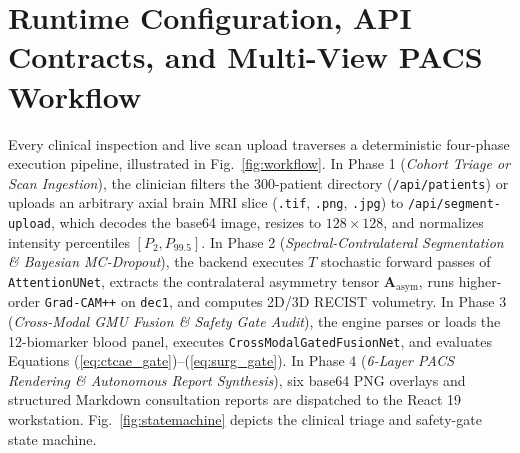 \documentclass[conference]{IEEEtran}
\begin{document}
\section{Runtime Configuration, API Contracts, and Multi-View PACS Workflow}
Every clinical inspection and live scan upload traverses a deterministic four-phase execution pipeline, illustrated in Fig.~\ref{fig:workflow}. In Phase 1 (\textit{Cohort Triage or Scan Ingestion}), the clinician filters the 300-patient directory (\texttt{/api/patients}) or uploads an arbitrary axial brain MRI slice (\texttt{.tif}, \texttt{.png}, \texttt{.jpg}) to \texttt{/api/segment-upload}, which decodes the base64 image, resizes to $128\times 128$, and normalizes intensity percentiles $[P_{2}, P_{99.5}]$. In Phase 2 (\textit{Spectral-Contralateral Segmentation \& Bayesian MC-Dropout}), the backend executes $T$ stochastic forward passes of \texttt{AttentionUNet}, extracts the contralateral asymmetry tensor $\mathbf{A}_{\text{asym}}$, runs higher-order \texttt{Grad-CAM++} on \texttt{dec1}, and computes 2D/3D RECIST volumetry. In Phase 3 (\textit{Cross-Modal GMU Fusion \& Safety Gate Audit}), the engine parses or loads the 12-biomarker blood panel, executes \texttt{CrossModalGatedFusionNet}, and evaluates Equations (\ref{eq:ctcae_gate})--(\ref{eq:surg_gate}). In Phase 4 (\textit{6-Layer PACS Rendering \& Autonomous Report Synthesis}), six base64 PNG overlays and structured Markdown consultation reports are dispatched to the React 19 workstation. Fig.~\ref{fig:statemachine} depicts the clinical triage and safety-gate state machine.
\end{document}
